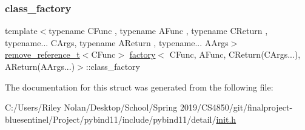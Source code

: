 \mbox{\label{structfactory_3_01_c_func_00_01_a_func_00_01_c_return_07_c_args_8_8_8_08_00_01_a_return_07_a_args_8_8_8_08_4_a1034d2e4f9cab5cac4ff96128f5e0399}} 
\subsubsection{\texorpdfstring{class\_factory}{class\_factory}}
{\footnotesize\ttfamily template$<$typename C\+Func , typename A\+Func , typename C\+Return , typename... C\+Args, typename A\+Return , typename... A\+Args$>$ \\
\mbox{\hyperlink{detail_2common_8h_a3a08cea569e6926ac8d7d74dd7178b5f}{remove\+\_\+reference\+\_\+t}}$<$C\+Func$>$ \mbox{\hyperlink{structfactory}{factory}}$<$ C\+Func, A\+Func, C\+Return(C\+Args...), A\+Return(A\+Args...)$>$\+::class\+\_\+factory}



The documentation for this struct was generated from the following file\+:\begin{DoxyCompactItemize}
\item 
C\+:/\+Users/\+Riley Nolan/\+Desktop/\+School/\+Spring 2019/\+C\+S4850/git/finalproject-\/bluesentinel/\+Project/pybind11/include/pybind11/detail/\mbox{\hyperlink{init_8h}{init.\+h}}\end{DoxyCompactItemize}
